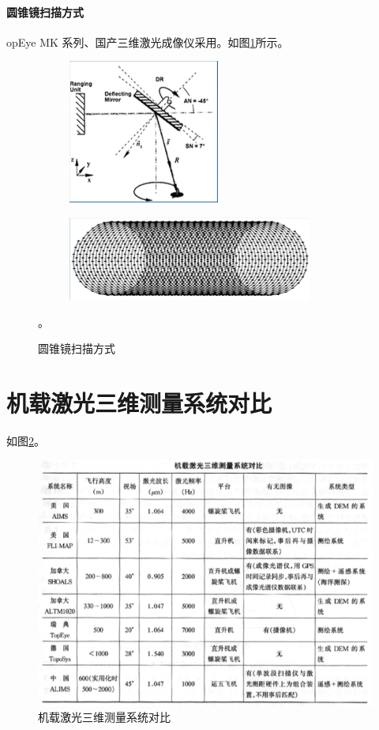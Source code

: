 \paragraph{圆锥镜扫描方式}opEye MK 系列、国产三维激光成像仪采用。如图\ref{fig:圆锥镜扫描方式}所示。
\begin{figure}[htbp]
	\centering
	\begin{subfigure}[t]{0.45\linewidth}
		\centering
		\includegraphics[width=0.5\linewidth]{figure/Chapter1/圆锥镜扫描_原理}
	\end{subfigure}
	\begin{subfigure}[t]{0.45\linewidth}
		\centering
		\includegraphics[width=0.8\linewidth]{figure/Chapter1/圆锥镜扫描_脚点}
	\end{subfigure}
	\caption{圆锥镜扫描方式}。
	\label{fig:圆锥镜扫描方式}
\end{figure}
\section{机载激光三维测量系统对比}
如图\ref{fig:机载激光三维测量系统对比}。
\begin{figure}[!htbp]
	\centering
	\includegraphics[width=1\linewidth]{figure/Chapter1/机载激光三维测量系统对比}
	\caption{机载激光三维测量系统对比}
	\label{fig:机载激光三维测量系统对比}
\end{figure}
